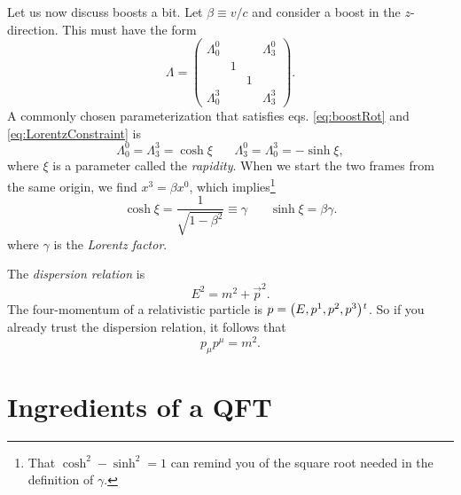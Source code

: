 Let us now discuss boosts a bit. Let $\beta\equiv v/c$ and consider a boost in
the $z$-direction. This must have the form
\begin{equation}
  \Lambda=\left(\begin{array}{cccc}
      \Lambda^0_0 &          &        & \Lambda^0_3\\
               & 1 &         & \\
               &   & 1 & \\
      \Lambda^3_0     &          &        & \Lambda^3_3
    \end{array}\right).
\end{equation}
A commonly chosen parameterization that satisfies eqs. \eqref{eq:boostRot} 
and \eqref{eq:LorentzConstraint} is
\begin{equation}
\Lambda^0_0=\Lambda^3_3=\cosh\xi~~~~~~~~
\Lambda^0_3=\Lambda^3_0=-\sinh\xi,
\end{equation} 
where $\xi$ is a parameter called the {\it rapidity}.
When we start the two frames from the same origin, we find $x^3=\beta
x^0$, which implies\footnote{That $\cosh^2-\sinh^2=1$ can remind you
of the square root needed in the definition of $\gamma$.}
\begin{equation}
\cosh\xi = \frac{1}{\sqrt{1-\beta^2}}\equiv\gamma ~~~~~~~~
\sinh\xi = \beta\gamma.
\end{equation}
where $\gamma$ is the {\it Lorentz factor}.

The {\it dispersion relation} is
\begin{equation}
E^2=m^2+\vec{p}^2.
\end{equation}
The four-momentum of a relativistic particle is $p=\trans{\left(E,p^1,p^2,p^3\right)}$.
So if you already trust the dispersion relation, it follows that
\begin{equation}\label{eq:p2eqm2}
p_\mu p^\mu = m^2.
\end{equation}

\section{Ingredients of a QFT}

